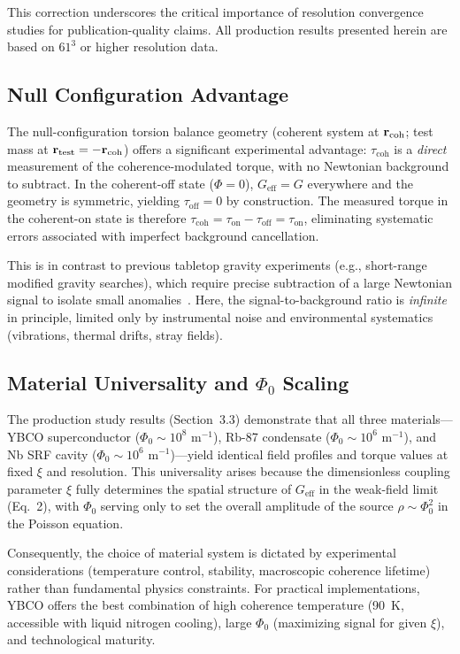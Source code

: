 \documentclass[10pt,twocolumn]{article}
\begin{document}
This correction underscores the critical importance of resolution convergence studies for publication-quality claims. All production results presented herein are based on $61^3$ or higher resolution data.

\subsection{Null Configuration Advantage}

The null-configuration torsion balance geometry (coherent system at ${\bf r}_{\text{coh}}$; test mass at ${\bf r}_{\text{test}} = -{\bf r}_{\text{coh}}$) offers a significant experimental advantage: $\tau_{\text{coh}}$ is a \textit{direct} measurement of the coherence-modulated torque, with no Newtonian background to subtract. In the coherent-off state ($\Phi = 0$), $G_{\text{eff}} = G$ everywhere and the geometry is symmetric, yielding $\tau_{\text{off}} = 0$ by construction. The measured torque in the coherent-on state is therefore $\tau_{\text{coh}} = \tau_{\text{on}} - \tau_{\text{off}} = \tau_{\text{on}}$, eliminating systematic errors associated with imperfect background cancellation.

This is in contrast to previous tabletop gravity experiments (e.g., short-range modified gravity searches), which require precise subtraction of a large Newtonian signal to isolate small anomalies~\cite{eotwash2008}. Here, the signal-to-background ratio is \textit{infinite} in principle, limited only by instrumental noise and environmental systematics (vibrations, thermal drifts, stray fields).

\subsection{Material Universality and $\Phi_0$ Scaling}

The production study results (Section~3.3) demonstrate that all three materials---YBCO superconductor ($\Phi_0 \sim 10^8$ m$^{-1}$), Rb-87 condensate ($\Phi_0 \sim 10^6$ m$^{-1}$), and Nb SRF cavity ($\Phi_0 \sim 10^6$ m$^{-1}$)---yield identical field profiles and torque values at fixed $\xi$ and resolution. This universality arises because the dimensionless coupling parameter $\xi$ fully determines the spatial structure of $G_{\text{eff}}$ in the weak-field limit (Eq.~2), with $\Phi_0$ serving only to set the overall amplitude of the source $\rho \sim \Phi_0^2$ in the Poisson equation.

Consequently, the choice of material system is dictated by experimental considerations (temperature control, stability, macroscopic coherence lifetime) rather than fundamental physics constraints. For practical implementations, YBCO offers the best combination of high coherence temperature (90~K, accessible with liquid nitrogen cooling), large $\Phi_0$ (maximizing signal for given $\xi$), and technological maturity.
\end{document}
